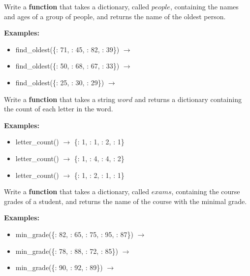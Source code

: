 




	\item 	
		Write a \textbf{function} that takes a dictionary, called $people$, containing the names and ages of a group of people, 
		and returns the name of the oldest person.

		\textbf{Examples:}		
		\begin{itemize}
			\item  find\_oldest(\{: 71, : 45, : 82, : 39\}) $\rightarrow$ 
			\item  find\_oldest(\{: 50, : 68, : 67, : 33\}) $\rightarrow$ 
			\item  find\_oldest(\{: 25, : 30, : 29\}) $\rightarrow$ 
		\end{itemize}



	\item 	
		Write a \textbf{function} that takes a string $word$ and returns a dictionary containing the count of each letter in the word. 

		\textbf{Examples:}		
		\begin{itemize}
			\item  letter\_count() $\rightarrow$ \{: 1, : 1, : 2, : 1\}
			\item  letter\_count() $\rightarrow$ \{: 1, : 4, : 4, : 2\}
			\item  letter\_count() $\rightarrow$ \{: 1, : 2, : 1, : 1\}
		\end{itemize}


	\item 	
		Write a \textbf{function} that takes a dictionary, called $exams$, containing the course grades of a student, 
		and returns the name of the course with the minimal grade.

		\textbf{Examples:}		
		\begin{itemize}
			\item  min\_grade(\{: 82, : 65, : 75, 
				: 95,  : 87\}) $\rightarrow$ 
			\item  min\_grade(\{: 78, : 88, : 72,
				 : 85\}) $\rightarrow$ 
			\item min\_grade(\{: 90, : 92, : 89\}) 
				$\rightarrow$ 
		\end{itemize}


